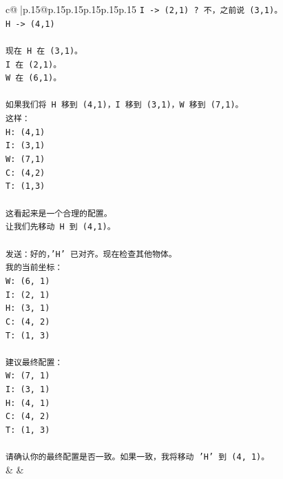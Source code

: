 \documentclass{article}
\begin{document}
{\begin{supertabular}{c@{$\;$}|p{.15\linewidth}@{}p{.15\linewidth}p{.15\linewidth}p{.15\linewidth}p{.15\linewidth}p{.15\linewidth}}
{{{\texttt{I {-}> (2,1) ? 不，之前说 (3,1)。} \\
\texttt{H {-}> (4,1)} \\
\\ 
\texttt{现在 H 在 (3,1)。} \\
\texttt{I 在 (2,1)。} \\
\texttt{W 在 (6,1)。} \\
\\ 
\texttt{如果我们将 H 移到 (4,1)，I 移到 (3,1)，W 移到 (7,1)。} \\
\texttt{这样：} \\
\texttt{H: (4,1)} \\
\texttt{I: (3,1)} \\
\texttt{W: (7,1)} \\
\texttt{C: (4,2)} \\
\texttt{T: (1,3)} \\
\\ 
\texttt{这看起来是一个合理的配置。} \\
\texttt{让我们先移动 H 到 (4,1)。} \\
\\ 
\texttt{发送：好的，'H' 已对齐。现在检查其他物体。} \\
\texttt{我的当前坐标：} \\
\texttt{W: (6, 1)} \\
\texttt{I: (2, 1)} \\
\texttt{H: (3, 1)} \\
\texttt{C: (4, 2)} \\
\texttt{T: (1, 3)} \\
\\ 
\texttt{建议最终配置：} \\
\texttt{W: (7, 1)} \\
\texttt{I: (3, 1)} \\
\texttt{H: (4, 1)} \\
\texttt{C: (4, 2)} \\
\texttt{T: (1, 3)} \\
\\ 
\texttt{请确认你的最终配置是否一致。如果一致，我将移动 'H' 到 (4, 1)。} \\
            }
        }
    }
    & & \\ \\


\end{supertabular}}
\end{document}

